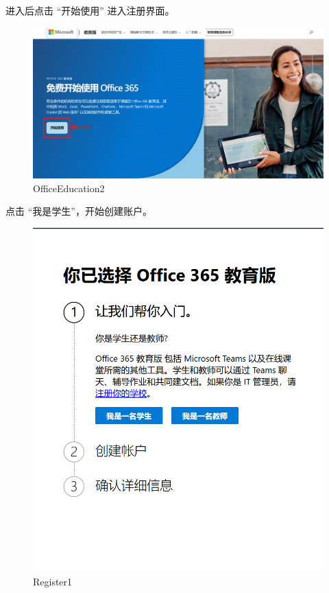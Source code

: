 \documentclass[]{ctexbook}
\theoremstyle{definition}
\theoremstyle{definition}
\theoremstyle{definition}
\theoremstyle{definition}
\theoremstyle{remark}
\begin{document}
进入后点击 ``开始使用'' 进入注册界面。

\begin{figure}

{\centering \includegraphics[width=1\linewidth]{img/OneDrive/Office_Education2} 

}

\caption{OfficeEducation2}\label{fig:OneDrive-OfficeEducation2}
\end{figure}

点击 ``我是学生''，开始创建账户。

\begin{figure}

{\centering \includegraphics[width=0.8\linewidth]{img/OneDrive/Register_1} 

}

\caption{Register1}\label{fig:OneDrive-Register1}
\end{figure}
\end{document}
